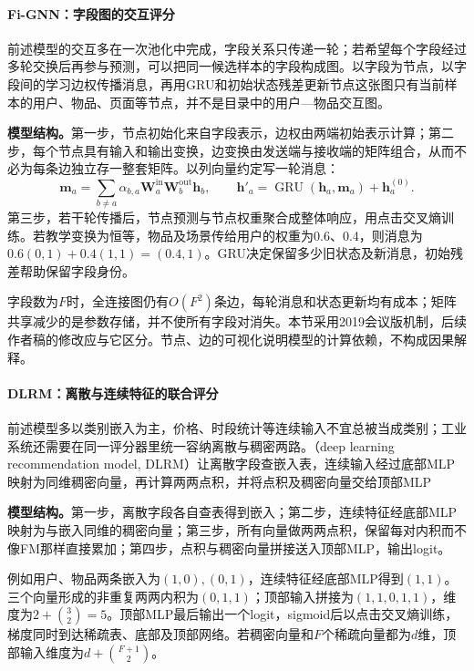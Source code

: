 \paragraph{Fi-GNN：字段图的交互评分}
\label{sec:rs-fi-gnn}

前述模型的交互多在一次池化中完成，字段关系只传递一轮；若希望每个字段经过多轮交换后再参与预测，可以把同一候选样本的字段构成图。以字段为节点，以字段间的学习边权传播消息，再用GRU和初始状态残差更新节点这张图只有当前样本的用户、物品、页面等节点，并不是目录中的用户—物品交互图。

\textbf{模型结构。}第一步，节点初始化来自字段表示，边权由两端初始表示计算；第二步，每个节点具有输入和输出变换，边变换由发送端与接收端的矩阵组合，从而不必为每条边独立存一整套矩阵。以列向量约定写一轮消息：
\[
 \bm m_a=\sum_{b\ne a}\alpha_{b,a}
       \bm W^{\mathrm{in}}_a\bm W^{\mathrm{out}}_b\bm h_b,\qquad
 \bm h'_a=\operatorname{GRU}(\bm h_a,\bm m_a)+\bm h_a^{(0)}.
\]
第三步，若干轮传播后，节点预测与节点权重聚合成整体响应，用点击交叉熵训练。若教学变换为恒等，物品及场景传给用户的权重为0.6、0.4，则消息为$0.6(0,1)+0.4(1,1)=(0.4,1)$。GRU决定保留多少旧状态及新消息，初始残差帮助保留字段身份。

字段数为$F$时，全连接图仍有$O(F^2)$条边，每轮消息和状态更新均有成本；矩阵共享减少的是参数存储，并不使所有字段对消失。本节采用2019会议版机制，后续作者稿的修改应与它区分。节点、边的可视化说明模型的计算依赖，不构成因果解释。

\paragraph{DLRM：离散与连续特征的联合评分}
\label{sec:rs-dlrm}

前述模型多以类别嵌入为主，价格、时段统计等连续输入不宜总被当成类别；工业系统还需要在同一评分器里统一容纳离散与稠密两路。（deep learning recommendation model, DLRM）让离散字段查嵌入表，连续输入经过底部MLP映射为同维稠密向量，再计算两两点积，并将点积及稠密向量交给顶部MLP

\textbf{模型结构。}第一步，离散字段各自查表得到嵌入；第二步，连续特征经底部MLP映射为与嵌入同维的稠密向量；第三步，所有向量做两两点积，保留每对内积而不像FM那样直接累加；第四步，点积与稠密向量拼接送入顶部MLP，输出logit。

例如用户、物品两条嵌入为$(1,0),(0,1)$，连续特征经底部MLP得到$(1,1)$。三个向量形成的非重复两两内积为$(0,1,1)$；顶部输入拼接为$(1,1,0,1,1)$，维度为$2+\binom32=5$。顶部MLP最后输出一个logit，sigmoid后以点击交叉熵训练，梯度同时到达稀疏表、底部及顶部网络。若稠密向量和$F$个稀疏向量都为$d$维，顶部输入维度为$d+\binom{F+1}{2}$。

